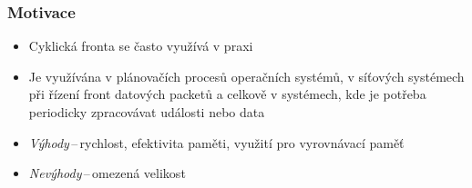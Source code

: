 \documentclass[]{fitthesispresn}
\begin{document}
    \begin{frame}[plain]
        \titlepage
    \end{frame}

    \begin{frame}
        \frametitle{Motivace}
        \begin{itemize}
            \item Cyklická fronta se často využívá v praxi
            \item Je využívána v plánovačích procesů operačních systémů, v síťových systémech při řízení front datových packetů a celkově v systémech, kde je potřeba periodicky zpracovávat události nebo data
            \item \emph{Výhody}\,--\,rychlost, efektivita paměti, využití pro vyrovnávací paměť
            \item \emph{Nevýhody}\,--\,omezená velikost
        \end{itemize}
    \end{frame}
\end{document}
